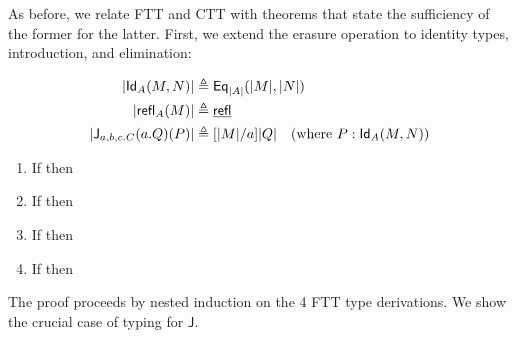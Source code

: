 \documentclass{article} \usepackage{chtt-notes} \usepackage{stmaryrd}
\begin{document}
As before, we relate FTT and CTT with theorems that state the sufficiency of the former for the latter. First,
we extend the erasure operation to identity types, introduction, and elimination:

\begin{align*}
\erase{\Id{A}{M}{N}} &\triangleq \Eq{\erase{A}}{\erase{M}}{\erase{N}}\\
\erase{\refl{A}{M}} &\triangleq \underline{\mathsf{refl}}\\
\erase{\Idelim{a,b,c.C}{a.Q}{P}} &\triangleq [\erase{M}/a]\erase{Q} \quad (\text{where } \hasEF{P}{\Id{A}{M}{N}})\\
\end{align*}

\begin{enumerate}
\item If  then 
\item If  then 
\item If  then 
\item If  then 
\end{enumerate}

The proof proceeds by nested induction on the 4 FTT type derivations. We show the crucial case of typing
for $\mathsf{J}$. 
\end{document}
